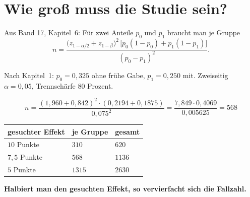 \section{Wie groß muss die Studie sein?}

\begin{merksatz}
Aus Band 17, Kapitel~6: Für zwei Anteile $p_0$ und $p_1$ braucht man je Gruppe
\[ n = \frac{\bigl(z_{1-\alpha/2} + z_{1-\beta}\bigr)^{2}\,\bigl[p_0(1-p_0) + p_1(1-p_1)\bigr]}{(p_0-p_1)^{2}} . \]

Nach Kapitel~1: $p_0 = 0{,}325$ ohne frühe Gabe, $p_1 = 0{,}250$ mit. Zweiseitig $\alpha = 0{,}05$, Trennschärfe $80$ Prozent.

\[ n = \frac{(1{,}960+0{,}842)^{2}\cdot(0{,}2194+0{,}1875)}{0{,}075^{2}} = \frac{7{,}849\cdot0{,}4069}{0{,}005625} = 568 \]

\begin{center}
{\small
\renewcommand{\arraystretch}{1.48}
\begin{tabular}{@{}P{2.6cm}P{2.4cm}P{2.4cm}@{}}
\toprule
\textbf{gesuchter Effekt} & \textbf{je Gruppe} & \textbf{gesamt}\\
\midrule
$10$ Punkte & $310$ & $620$\\
$7{,}5$ Punkte & $568$ & $1136$\\
$5$ Punkte & $1315$ & $2630$\\
\bottomrule
\end{tabular}}
\end{center}

\begin{center}
\begin{minipage}{0.9\textwidth}
\textbf{Halbiert man den gesuchten Effekt, so vervierfacht sich die Fallzahl.}
\end{minipage}
\end{center}

\begin{center}
\begin{minipage}{0.88\textwidth}
\end{minipage}
\end{center}
\end{merksatz}

